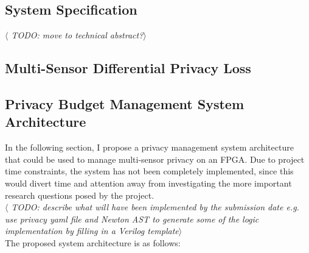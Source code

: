 \documentclass[12pt]{article}
\begin{document}
  \subsection{System Specification}
    \textit{$\langle$ TODO: move to technical abstract?$\rangle$}

  \subsection{Multi-Sensor Differential Privacy Loss}

  \subsection{Privacy Budget Management System Architecture}
    In the following section, I propose a privacy management system architecture that could be used to manage multi-sensor privacy on an FPGA. Due to project time constraints, the system has not been completely implemented, since this would divert time and attention away from investigating the more important research questions posed by the project.
    \\
    \textit{$\langle$ TODO: describe what will have been implemented by the submission date e.g. use privacy yaml file and Newton AST to generate some of the logic implementation by filling in a Verilog template$\rangle$}
    \\
    The proposed system architecture is as follows:
\end{document}
